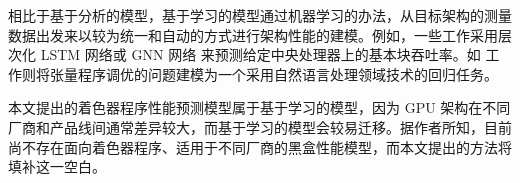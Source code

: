 
相比于基于分析的模型，基于学习的模型通过机器学习的办法，从目标架构的测量数据出发来以较为统一和自动的方式进行架构性能的建模。例如，一些工作采用层次化 LSTM 网络\cite{pmlr-v97-mendis19a}或 GNN 网络 \cite{9975403}来预测给定中央处理器上的基本块吞吐率。如 \citet{10.1145/3575693.3575737} 工作则将张量程序调优的问题建模为一个采用自然语言处理领域技术的回归任务。



本文提出的着色器程序性能预测模型属于基于学习的模型，因为 GPU 架构在不同厂商和产品线间通常差异较大，而基于学习的模型会较易迁移。据作者所知，目前尚不存在面向着色器程序、适用于不同厂商的黑盒性能模型，而本文提出的方法将填补这一空白。
